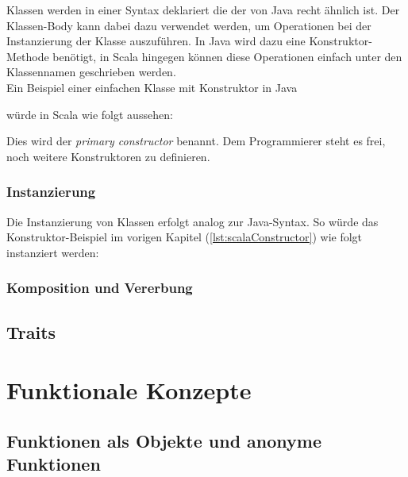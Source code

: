 Klassen werden in einer Syntax deklariert die der von Java recht
ähnlich ist. Der Klassen-Body kann dabei dazu verwendet werden,
um Operationen bei der Instanzierung der Klasse auszuführen. In Java
wird dazu eine Konstruktor-Methode benötigt, in Scala hingegen können
diese Operationen einfach unter den Klassennamen geschrieben werden. \\

Ein Beispiel einer einfachen Klasse mit Konstruktor in Java


würde in Scala wie folgt aussehen:


Dies wird der \emph{primary constructor} benannt. Dem Programmierer steht es 
frei, noch weitere Konstruktoren zu definieren.


\subsubsection{Instanzierung}

Die Instanzierung von Klassen erfolgt analog zur Java-Syntax. So würde das 
Konstruktor-Beispiel im vorigen Kapitel (\ref{lst:scalaConstructor}) wie 
folgt instanziert werden:



\subsubsection{Komposition und Vererbung}


\subsection{Traits}




\section{Funktionale Konzepte}

\subsection{Funktionen als Objekte und anonyme Funktionen}
\label{sec:functionsObjects}

